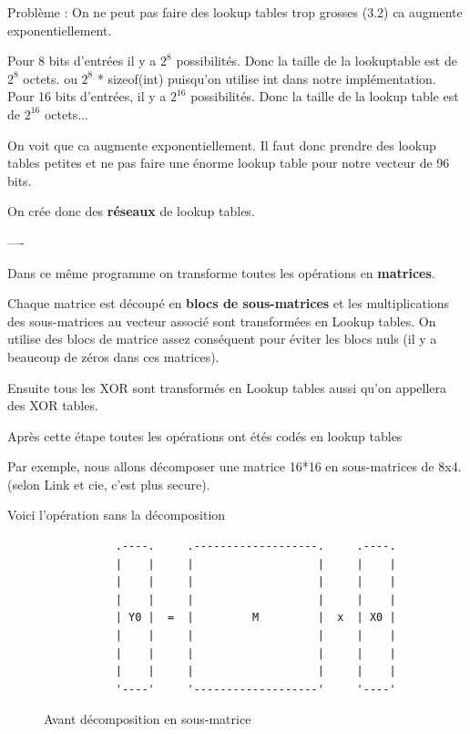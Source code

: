 \documentclass[a4paper,12pt]{article}
\begin{document}
Problème :
On ne peut pas faire des lookup tables trop grosses (3.2) ca augmente exponentiellement.

Pour 8 bits d'entrées il y a $2^{8}$ possibilités. Donc la taille de la lookuptable est de $2^{8}$ octets. ou $2^{8}$ * sizeof(int) puisqu'on utilise int dans notre implémentation.
Pour 16 bits d'entrées, il y a $2^{16}$ possibilités. Donc la taille de la lookup table est de $2^{16}$ octets...

On voit que ca augmente exponentiellement. Il faut donc prendre des lookup tables petites et ne pas faire une énorme lookup table pour notre vecteur de 96 bits.

On crée donc des \textbf{réseaux} de lookup tables.

----

Dans ce même programme on transforme toutes les opérations en \textbf{matrices}.

Chaque matrice est découpé en \textbf{blocs de sous-matrices} et les multiplications des sous-matrices au vecteur associé sont transformées en Lookup tables. On utilise des blocs de matrice assez conséquent pour éviter les blocs nuls (il y a beaucoup de zéros dans ces matrices).

Ensuite tous les XOR sont transformés en Lookup tables aussi qu'on appellera des XOR tables.

Après cette étape toutes les opérations ont étés codés en lookup tables

Par exemple, nous allons décomposer une matrice 16*16 en sous-matrices de 8x4. (selon Link et cie, c'est plus secure).

Voici l'opération sans la décomposition

\begin{figure}[h]
\begin{verbatim}
           .----.     .-------------------.     .----.
           |    |     |                   |     |    |
           |    |     |                   |     |    |
           |    |     |                   |     |    |
           | Y0 |  =  |         M         |  x  | X0 |
           |    |     |                   |     |    |
           |    |     |                   |     |    |
           |    |     |                   |     |    |
           '----'     '-------------------'     '----'

\end{verbatim}
\caption{Avant décomposition en sous-matrice}
\label{fig:ascii-box}
\end{figure}
\end{document}
